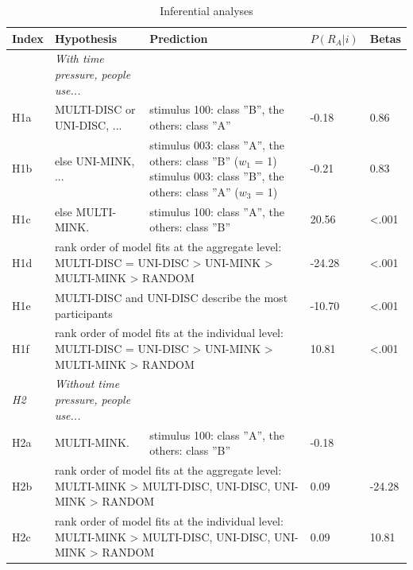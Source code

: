 \documentclass[a4paper,man,natbib]{apa6}
\begin{document}
\begin{table}
\begin{center}
\begin{threeparttable}
\caption{Inferential analyses}
\label{tab:inferential}
\begin{tabular*}{\textwidth}{lp{55mm}p{100mm}ll}
\toprule
\multicolumn{1}{l}{Index} & \multicolumn{1}{l}{Hypothesis} & \multicolumn{1}{l}{Prediction} & \multicolumn{1}{l}{$P(R_{A}|i)$} & \multicolumn{1}{l}{Betas}\\
\midrule
\addlinespace
\multicolumn{1}{l}{\emph{H1}} & \multicolumn{1}{l}{\emph{With time pressure, people use...}} \\
\addlinespace
H1a & MULTI-DISC or UNI-DISC, ... & stimulus 100: class ''B'', the others: class ''A'' & -0.18 & 0.86\\
\addlinespace
H1b & else UNI-MINK, ...  & stimulus 003: class ''A'', the others: class ''B'' ($w_1$ = 1) \newline stimulus 003: class ''B'', the others: class ''A'' ($w_3$ = 1) & -0.21 & 0.83\\
\addlinespace
H1c & else MULTI-MINK. & stimulus 100: class ''A'', the others: class ''B'' & 20.56 & <.001\\
\addlinespace
H1d & \multicolumn{2}{p{135mm}}{rank order of model fits at the aggregate level: \newline MULTI-DISC = UNI-DISC > UNI-MINK > MULTI-MINK > RANDOM} & -24.28 & <.001\\
\addlinespace
H1e & \multicolumn{2}{l}{MULTI-DISC and UNI-DISC describe the most participants} & -10.70 & <.001\\
\addlinespace
H1f & \multicolumn{2}{p{135mm}}{rank order of model fits at the individual level: \newline MULTI-DISC = UNI-DISC > UNI-MINK > MULTI-MINK > RANDOM} & 10.81 & <.001\\
\midrule
\multicolumn{1}{l}{\emph{H2}} & \multicolumn{1}{l}{\emph{Without time pressure, people use...}} \\
\addlinespace
H2a & MULTI-MINK. & stimulus 100: class ''A'', the others: class ''B'' & -0.18\\
\addlinespace
H2b & \multicolumn{2}{p{150mm}}{rank order of model fits at the aggregate level: \newline MULTI-MINK > {MULTI-DISC, UNI-DISC, UNI-MINK} > RANDOM} & 0.09 & -24.28\\
\addlinespace
H2c & \multicolumn{2}{p{150mm}}{rank order of model fits at the individual level: \newline MULTI-MINK > {MULTI-DISC, UNI-DISC, UNI-MINK} > RANDOM} & 0.09 & 10.81 \\

\end{tabular*}
\end{threeparttable}
\end{center}
\end{table}
\end{document}
